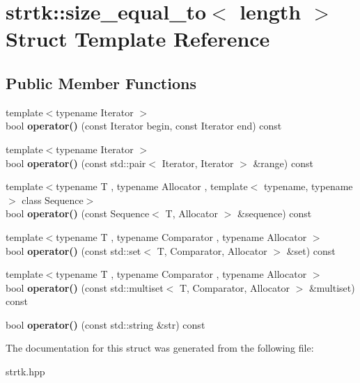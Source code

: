 \hypertarget{structstrtk_1_1size__equal__to}{\section{strtk\-:\-:size\-\_\-equal\-\_\-to$<$ length $>$ Struct Template Reference}
\label{structstrtk_1_1size__equal__to}
}
\subsection*{Public Member Functions}
\begin{DoxyCompactItemize}
\item 
\hypertarget{structstrtk_1_1size__equal__to_a91541037beedc2c1be0d21f6185bb270}{{\footnotesize template$<$typename Iterator $>$ }\\bool {\bfseries operator()} (const Iterator begin, const Iterator end) const }\label{structstrtk_1_1size__equal__to_a91541037beedc2c1be0d21f6185bb270}

\item 
\hypertarget{structstrtk_1_1size__equal__to_ab8d20e5865856c59404503dd5c48b719}{{\footnotesize template$<$typename Iterator $>$ }\\bool {\bfseries operator()} (const std\-::pair$<$ Iterator, Iterator $>$ \&range) const }\label{structstrtk_1_1size__equal__to_ab8d20e5865856c59404503dd5c48b719}

\item 
\hypertarget{structstrtk_1_1size__equal__to_a78b1993db01ee0d7332b504d57c7e04f}{{\footnotesize template$<$typename T , typename Allocator , template$<$ typename, typename $>$ class Sequence$>$ }\\bool {\bfseries operator()} (const Sequence$<$ T, Allocator $>$ \&sequence) const }\label{structstrtk_1_1size__equal__to_a78b1993db01ee0d7332b504d57c7e04f}

\item 
\hypertarget{structstrtk_1_1size__equal__to_ad23cd77149e3e511b6446496c4fc277e}{{\footnotesize template$<$typename T , typename Comparator , typename Allocator $>$ }\\bool {\bfseries operator()} (const std\-::set$<$ T, Comparator, Allocator $>$ \&set) const }\label{structstrtk_1_1size__equal__to_ad23cd77149e3e511b6446496c4fc277e}

\item 
\hypertarget{structstrtk_1_1size__equal__to_a24bb839d4af6667a29e6b4a49aa0796c}{{\footnotesize template$<$typename T , typename Comparator , typename Allocator $>$ }\\bool {\bfseries operator()} (const std\-::multiset$<$ T, Comparator, Allocator $>$ \&multiset) const }\label{structstrtk_1_1size__equal__to_a24bb839d4af6667a29e6b4a49aa0796c}

\item 
\hypertarget{structstrtk_1_1size__equal__to_ab21772c7c3fad75418d5e00c67751f0d}{bool {\bfseries operator()} (const std\-::string \&str) const }\label{structstrtk_1_1size__equal__to_ab21772c7c3fad75418d5e00c67751f0d}

\end{DoxyCompactItemize}


The documentation for this struct was generated from the following file\-:\begin{DoxyCompactItemize}
\item 
strtk.\-hpp\end{DoxyCompactItemize}
